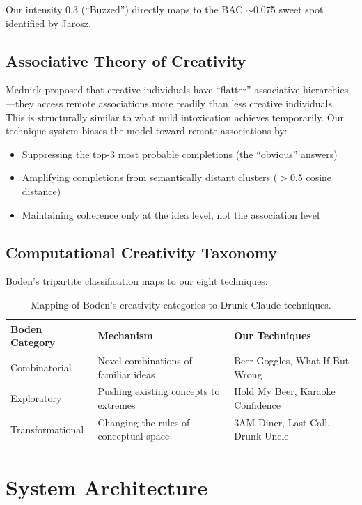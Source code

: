 \documentclass[11pt,a4paper]{article}
\begin{document}
Our intensity 0.3 (``Buzzed'') directly maps to the BAC $\sim$0.075 sweet spot identified by Jarosz.

\subsection{Associative Theory of Creativity}

Mednick \cite{mednick1962associative} proposed that creative individuals have ``flatter'' associative hierarchies---they access remote associations more readily than less creative individuals. This is structurally similar to what mild intoxication achieves temporarily. Our technique system biases the model toward remote associations by:

\begin{itemize}
    \item Suppressing the top-3 most probable completions (the ``obvious'' answers)
    \item Amplifying completions from semantically distant clusters ($>$0.5 cosine distance)
    \item Maintaining coherence only at the idea level, not the association level
\end{itemize}

\subsection{Computational Creativity Taxonomy}

Boden's \cite{boden1990creative} tripartite classification maps to our eight techniques:

\begin{table}[H]
\centering
\begin{tabular}{@{}lll@{}}
\toprule
\textbf{Boden Category} & \textbf{Mechanism} & \textbf{Our Techniques} \\
\midrule
Combinatorial & Novel combinations of familiar ideas & Beer Goggles, What If But Wrong \\
Exploratory & Pushing existing concepts to extremes & Hold My Beer, Karaoke Confidence \\
Transformational & Changing the rules of conceptual space & 3AM Diner, Last Call, Drunk Uncle \\
\bottomrule
\end{tabular}
\caption{Mapping of Boden's creativity categories to Drunk Claude techniques.}
\label{tab:boden}
\end{table}

\section{System Architecture}
\end{document}
